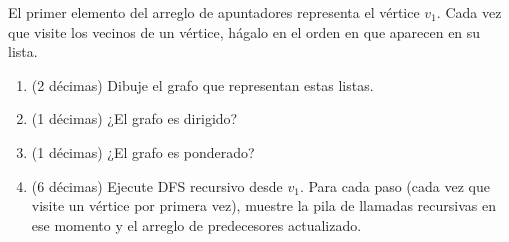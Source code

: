 {\begin{center}
\end{center}

El primer elemento del arreglo de apuntadores representa el vértice \(v_1\). Cada vez que visite los vecinos de un vértice, hágalo en el orden en que aparecen en su lista.
}

\begin{enumerate}
  \item (2 décimas) Dibuje el grafo que representan estas listas.
  \item (1 décimas) ¿El grafo es dirigido?
  \item (1 décimas) ¿El grafo es ponderado?
  \item (6 décimas) Ejecute DFS recursivo desde \(v_1\). Para cada paso (cada vez que visite un vértice por primera vez), muestre la pila de llamadas recursivas en ese momento y el arreglo de predecesores actualizado.
\end{enumerate}

\bigskip
